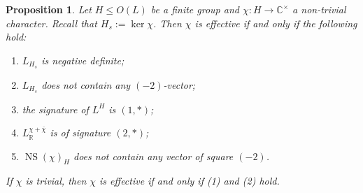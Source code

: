\documentclass[a4paper]{amsart}
\theoremstyle{definition}
\theoremstyle{plain}
\newtheorem{proposition}[definition]{Proposition}
\DeclareMathOperator{\NS}{NS}
\newcommand{\RR}{\mathbb{R}}
\newcommand{\CC}{\mathbb{C}}
\begin{document}
\begin{proposition}\label{iseffective}
Let $H\leq O(L)$ be a finite group and $\chi \colon H \to \CC^\times$ a non-trivial character. Recall that $H_s := \ker \chi$. Then $\chi$ is effective if and only if the following hold:
\begin{enumerate}
 \item $L_{H_s}$ is negative definite;
 \item $L_{H_s}$ does not contain any $(-2)$-vector;
 \item the signature of $L^H$ is $(1,*)$;
 \item $L_\RR^{\chi+\bar \chi}$ is of signature $(2,*)$;
 \item $\NS(\chi)_H$ does not contain any vector of square $(-2)$.
 \end{enumerate}
If $\chi$ is trivial, then $\chi$ is effective if and only if (1) and (2) hold.
\end{proposition}
\end{document}
